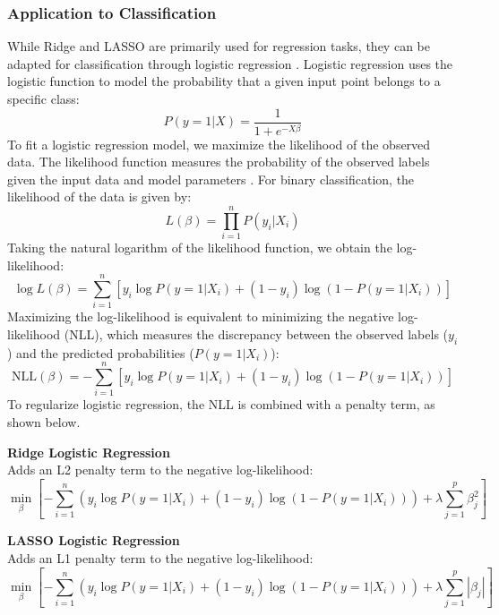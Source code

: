 \documentclass[english,11pt,a4paper,titlepage]{article}
\begin{document}
	\subsubsection*{Application to Classification}
	While Ridge and LASSO are primarily used for regression tasks, they can be adapted for classification through logistic regression \cite{friedmanRegularizationPathsGeneralized2010,hastieElementsStatisticalLearning2009}. Logistic regression uses the logistic function to model the probability that a given input point belongs to a specific class:
	\begin{equation*}
		P(y=1|X) = \frac{1}{1 + e^{-X\beta}}
	\end{equation*}
	To fit a logistic regression model, we maximize the likelihood of the observed data. The likelihood function measures the probability of the observed labels given the input data and model parameters \cite{whitlockAnalysisBiologicalData2015}. For binary classification, the likelihood of the data is given by:
	\begin{equation*}
		L(\beta) = \prod_{i=1}^{n} P(y_i | X_i)
	\end{equation*}
	Taking the natural logarithm of the likelihood function, we obtain the log-likelihood:
	\begin{equation*}
		\log L(\beta) = \sum_{i=1}^{n} \left[ y_i \log P(y=1|X_i) + (1-y_i) \log (1 - P(y=1|X_i)) \right]
	\end{equation*}
	Maximizing the log-likelihood is equivalent to minimizing the negative log-likelihood (NLL), which measures the discrepancy between the observed labels (\( y_i \)) and the predicted probabilities (\( P(y = 1 | X_i )\)):
	\begin{equation*}
		\text{NLL}(\beta) = -\sum_{i=1}^{n} \left[ y_i \log P(y=1|X_i) + (1-y_i) \log (1 - P(y=1|X_i)) \right]
	\end{equation*}
	To regularize logistic regression, the NLL is combined with a penalty term, as shown below.
	
	\noindent
	\textbf{Ridge Logistic Regression} \\
	Adds an L2 penalty term to the negative log-likelihood:
	\begin{equation*}
		\min_{\beta} \left[ -\sum_{i=1}^{n} \left( y_i \log P(y=1|X_i) + (1-y_i) \log (1 - P(y=1|X_i)) \right) + \lambda \sum_{j=1}^{p}\beta_{j}^{2} \right]
	\end{equation*}
	
	\noindent
	\textbf{LASSO Logistic Regression} \\
	Adds an L1 penalty term to the negative log-likelihood:
	\begin{equation*}
		\min_{\beta} \left[ -\sum_{i=1}^{n} \left( y_i \log P(y=1|X_i) + (1-y_i) \log (1 - P(y=1|X_i)) \right) + \lambda \sum_{j=1}^{p}|\beta_{j}| \right]
	\end{equation*}
	
\end{document}
